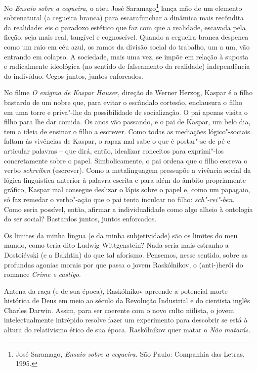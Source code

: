 No \emph{Ensaio sobre a cegueira}, o ateu José Saramago\footnote{José
  Saramago, \emph{Ensaio sobre a cegueira.} São Paulo: Companhia das
  Letras, 1995.} lança mão de um elemento sobrenatural (a cegueira
branca) para escarafunchar a dinâmica mais recôndita da realidade: eis o
paradoxo estético que faz com que a realidade, escavada pela ficção,
seja mais real, tangível e cognoscível. Quando a cegueira branca
despenca como um raio em céu azul, os ramos da divisão social do
trabalho, um a um, vão entrando em colapso. A sociedade, mais uma vez,
se impõe em relação à suposta e radicalmente ideológica (no sentido de
falseamento da realidade) independência do indivíduo. Cegos juntos,
juntos enforcados.

No filme \emph{O enigma de Kaspar Hauser}, direção de Werner Herzog,
Kaspar é o filho bastardo de um nobre que, para evitar o escândalo
cortesão, enclausura o filho em uma torre e priva"-lhe da possibilidade
de socialização. O pai apenas visita o filho para lhe dar comida. Os
anos vão passando, e o pai de Kaspar, um belo dia, tem a ideia de
ensinar o filho a escrever. Como todas as mediações lógico"-sociais
faltam às vivências de Kaspar, o rapaz mal sabe o que é postar"-se de pé
e articular palavras -- que dirá, então, idealizar conceitos para
exprimi"-los concretamente sobre o papel. Simbolicamente, o pai ordena
que o filho escreva o verbo \emph{schreiben} (escrever). Como a
metalinguagem pressupõe a vivência social da lógica linguística anterior
à palavra escrita e para além do âmbito propriamente gráfico, Kaspar mal
consegue deslizar o lápis sobre o papel e, como um papagaio, só faz
remedar o verbo"-ação que o pai tenta inculcar no filho:
\emph{sch"-rei"-ben}. Como seria possível, então, afirmar a
individualidade como algo alheio à ontologia do ser social? Bastardos
juntos, juntos enforcados.

Os limites da minha língua (e da minha subjetividade) são os limites do
meu mundo, como teria dito Ludwig Wittgenstein? Nada seria mais estranho
a Dostoiévski (e a Bakhtin) do que tal aforismo. Pensemos, nesse
sentido, sobre as profundas agonias morais por que passa o jovem
Raskólnikov, o (anti-)herói do romance \emph{Crime e castigo}.

Antena da raça (e de sua época), Raskólnikov apreende a potencial morte
histórica de Deus em meio ao século  da Revolução Industrial e do
cientista inglês Charles Darwin. Assim, para ser coerente com o novo
culto niilista, o jovem intelectualmente intrépido resolve fazer um
experimento para descobrir se está à altura do relativismo ético de sua
época. Raskólnikov quer matar o \emph{Não matarás}.

